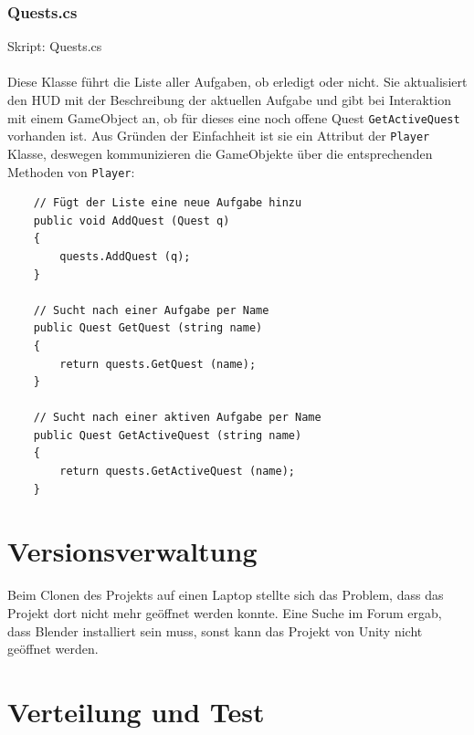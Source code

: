 \subsubsection{Quests.cs}
Skript: Quests.cs\\\\
Diese Klasse führt die Liste aller Aufgaben, ob erledigt oder nicht. Sie  aktualisiert den HUD mit der Beschreibung der aktuellen Aufgabe und gibt bei Interaktion mit einem GameObject an, ob für dieses eine noch offene Quest \lstinline{GetActiveQuest} vorhanden ist. Aus Gründen der Einfachheit ist sie ein Attribut der \lstinline{Player} Klasse, deswegen kommunizieren die GameObjekte über die entsprechenden Methoden von \lstinline{Player}:

\begin{lstlisting}
	// Fügt der Liste eine neue Aufgabe hinzu
	public void AddQuest (Quest q)
	{
		quests.AddQuest (q);
	}

	// Sucht nach einer Aufgabe per Name
	public Quest GetQuest (string name)
	{
		return quests.GetQuest (name);
	}

	// Sucht nach einer aktiven Aufgabe per Name
	public Quest GetActiveQuest (string name)
	{
		return quests.GetActiveQuest (name);
	}
\end{lstlisting}








\section{Versionsverwaltung}

Beim Clonen des Projekts auf einen Laptop stellte sich das Problem, dass das Projekt dort nicht mehr geöffnet werden konnte. Eine Suche im Forum ergab, dass Blender installiert sein muss, sonst kann das Projekt von Unity nicht geöffnet werden.

\section{Verteilung und Test}

